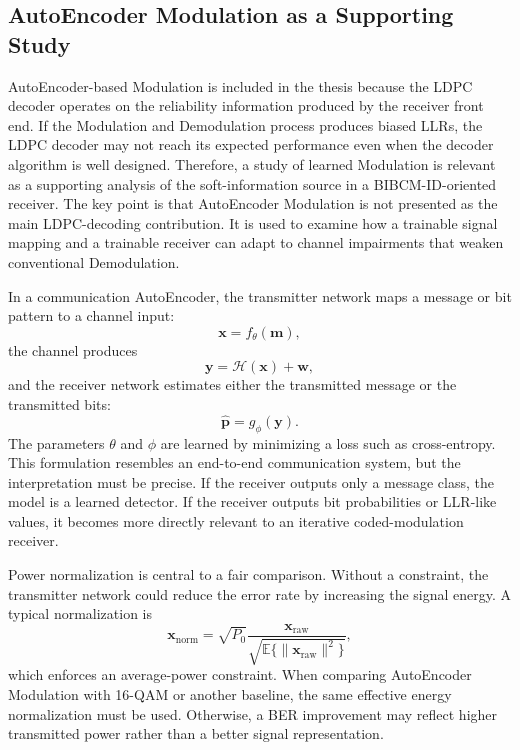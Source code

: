 \subsection{AutoEncoder Modulation as a Supporting Study}
AutoEncoder-based Modulation is included in the thesis because the LDPC decoder operates on the reliability information produced by the receiver front end. If the Modulation and Demodulation process produces biased LLRs, the LDPC decoder may not reach its expected performance even when the decoder algorithm is well designed. Therefore, a study of learned Modulation is relevant as a supporting analysis of the soft-information source in a BIBCM-ID-oriented receiver. The key point is that AutoEncoder Modulation is not presented as the main LDPC-decoding contribution. It is used to examine how a trainable signal mapping and a trainable receiver can adapt to channel impairments that weaken conventional Demodulation.

In a communication AutoEncoder, the transmitter network maps a message or bit pattern to a channel input:
\begin{equation}
  \mathbf{x}=f_\theta(\mathbf{m}),
\end{equation}
the channel produces
\begin{equation}
  \mathbf{y}=\mathcal{H}(\mathbf{x})+\mathbf{w},
\end{equation}
and the receiver network estimates either the transmitted message or the transmitted bits:
\begin{equation}
  \hat{\mathbf{p}}=g_\phi(\mathbf{y}).
\end{equation}
The parameters $\theta$ and $\phi$ are learned by minimizing a loss such as cross-entropy. This formulation resembles an end-to-end communication system, but the interpretation must be precise. If the receiver outputs only a message class, the model is a learned detector. If the receiver outputs bit probabilities or LLR-like values, it becomes more directly relevant to an iterative coded-modulation receiver.

Power normalization is central to a fair comparison. Without a constraint, the transmitter network could reduce the error rate by increasing the signal energy. A typical normalization is
\begin{equation}
  \mathbf{x}_{\mathrm{norm}}
  =
  \sqrt{P_0}
  \frac{\mathbf{x}_{\mathrm{raw}}}
  {\sqrt{\mathbb{E}\{\|\mathbf{x}_{\mathrm{raw}}\|^2\}}},
\end{equation}
which enforces an average-power constraint. When comparing AutoEncoder Modulation with 16-QAM or another baseline, the same effective energy normalization must be used. Otherwise, a BER improvement may reflect higher transmitted power rather than a better signal representation.

